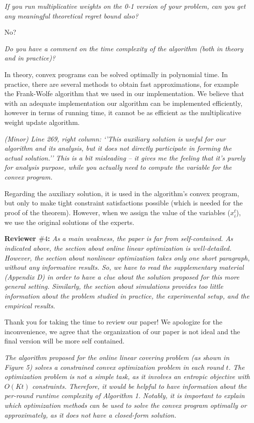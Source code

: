 \documentclass[12pt]{article}
\begin{document}
\textit{\color{red} 
If you run multiplicative weights on the 0-1 version of your problem, can you get any meaningful theoretical regret bound also?}

No?

\textit{\color{red} 
Do you have a comment on the time complexity of the algorithm (both in theory and in practice)?}

In theory, convex programs can be solved optimally in polynomial time. In practice, there are several methods to obtain fast approximations, for example the Frank-Wolfe algorithm that we used in our implementation. We believe that with an adequate implementation our algorithm can be implemented efficiently, however in terms of running time, it cannot be as efficient as the multiplicative weight update algorithm.

\textit{\color{red}
(Minor) Line 269, right column: ‘’This auxiliary solution is useful for our algorithm and its analysis, but it does not directly participate in forming the actual solution.’’ This is a bit misleading – it gives me the feeling that it’s purely for analysis purpose, while you actually need to compute the variable for the convex program.}

Regarding the auxiliary solution, it is used in the algorithm's convex program, but only to make tight constraint satisfactions possible (which is needed for the proof of the theorem). However, when we assign the value of the variables ($x_i^t$), we use the original solutions of the experts.



\vspace{1cm}
\noindent \textbf{Reviewer $\#4$:} 
\textit{\color{red}
As a main weakness, the paper is far from self-contained. As indicated above, the section about online linear optimization is well-detailed. However, the section about nonlinear optimization takes only one short paragraph, without any informative results. So, we have to read the supplementary material (Appendix D) in order to have a clue about the solution proposed for this more general setting. Similarly, the section about simulations provides too little information about the problem studied in practice, the experimental setup, and the empirical results.}

Thank you for taking the time to review our paper! We apologize for the inconvenience, we agree that the organization of our paper is not ideal and the final version will be more self contained. 

\textit{\color{red}
The algorithm proposed for the online linear covering problem (as shown in Figure 5) solves a constrained convex optimization problem in each round $t$. The optimization problem is not a simple task, as it involves an entropic objective with $O(Kt)$ constraints. Therefore, it would be helpful to have information about the per-round runtime complexity of Algorithm 1. Notably, it is important to explain which optimization methods can be used to solve the convex program optimally or approximately, as it does not have a closed-form solution.}
\end{document}
